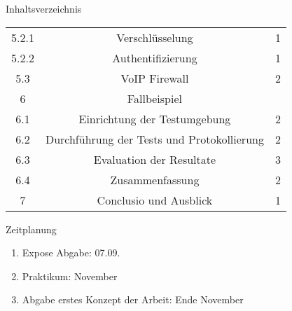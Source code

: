 \documentclass[a4paper,11pt,ngerman]{INSOexpose}
\begin{document}
\begin{section}{Inhaltsverzeichnis}
\begin{longtable}{c|c|c}
5.2.1 & Verschlüsselung & 1 \\ 
5.2.2 & Authentifizierung & 1 \\ 
5.3 & VoIP Firewall & 2 \\ 
6 & Fallbeispiel &  \\ 
6.1 & Einrichtung der Testumgebung & 2 \\ 
6.2 & Durchführung der Tests und Protokollierung & 2 \\ 
6.3 & Evaluation der Resultate & 3 \\ 
6.4 & Zusammenfassung & 2 \\ 
7 & Conclusio und Ausblick & 1 \\ 
\end{longtable} 
\end{section}
\pagebreak

\begin{section}{Zeitplanung}
\begin{enumerate}
\item Expose Abgabe: 07.09.
\item Praktikum: November
\item Abgabe erstes Konzept der Arbeit: Ende November
\end{enumerate}
\end{section}
\pagebreak

\printbibliography
\end{document}
